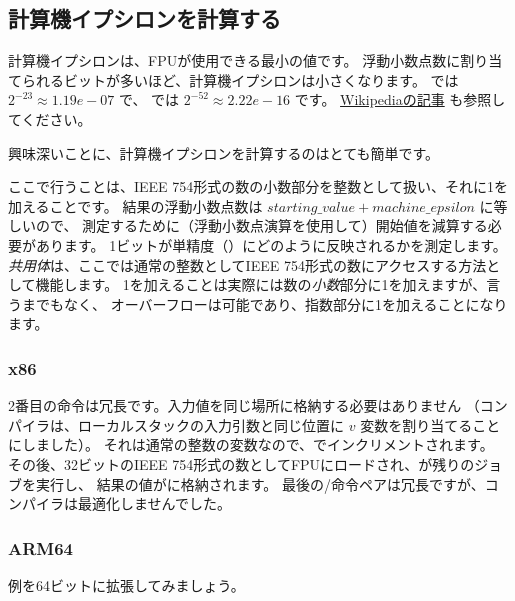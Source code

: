 ﻿\subsection{計算機イプシロンを計算する}

計算機イプシロンは、\ac{FPU}が使用できる最小の値です。 
浮動小数点数に割り当てられるビットが多いほど、計算機イプシロンは小さくなります。
\Tfloat では $2^{-23} \approx 1.19e-07$ で、 \Tdouble では $2^{-52} \approx 2.22e-16$ です。
\href{https://en.wikipedia.org/wiki/Arithmetic_underflow}{Wikipediaの記事} も参照してください。

興味深いことに、計算機イプシロンを計算するのはとても簡単です。



ここで行うことは、IEEE 754形式の数の小数部分を整数として扱い、それに1を加えることです。
結果の浮動小数点数は $starting\_value+machine\_epsilon$ に等しいので、
測定するために（浮動小数点演算を使用して）開始値を減算する必要があります。
1ビットが単精度（\Tfloat）にどのように反映されるかを測定します。
\emph{共用体}は、ここでは通常の整数としてIEEE 754形式の数にアクセスする方法として機能します。 
1を加えることは実際には数の\emph{小数}部分に1を加えますが、言うまでもなく、
オーバーフローは可能であり、指数部分に1を加えることになります。

\subsubsection{x86}



2番目の命令は冗長です。入力値を同じ場所に格納する必要はありません
（コンパイラは、ローカルスタックの入力引数と同じ位置に $v$ 変数を割り当てることにしました）。
それは通常の整数の変数なので、でインクリメントされます。 
その後、32ビットのIEEE 754形式の数としてFPUにロードされ、が残りのジョブを実行し、
結果の値がに格納されます。 
最後の/命令ペアは冗長ですが、コンパイラは最適化しませんでした。

\subsubsection{ARM64}

例を64ビットに拡張してみましょう。



